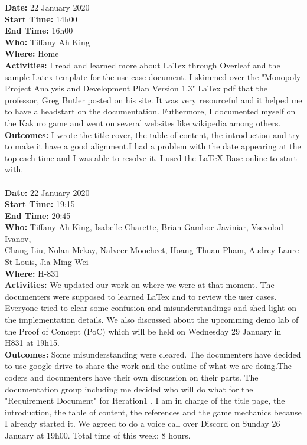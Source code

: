\documentclass[12pt]{article}
\begin{document}
{\bf Date:} 22 January 2020\\
{\bf Start Time:} 14h00\\
{\bf End Time:} 16h00\\
{\bf Who:} Tiffany Ah King\\
{\bf Where:} Home\\
{\bf Activities:} I read and learned more about LaTex through Overleaf and the sample Latex template for the use case document. I skimmed over the "Monopoly Project Analysis and Development Plan Version 1.3" LaTex pdf that the professor, Greg Butler posted on his site. It was very resourceful and it helped me to have a headstart on the documentation. Futhermore, I documented myself on the Kakuro game and went on several websites like wikipedia among others.\\
{\bf Outcomes:} I wrote the title cover, the table of content, the introduction and try to make it have a good alignment.I had a problem with the date appearing at the top each time and I was able to resolve it. I used the LaTeX Base online to start with.\\ \\

{\bf Date:} 22 January 2020\\
{\bf Start Time:} 19:15\\
{\bf End Time:} 20:45\\
{\bf Who:} Tiffany Ah King, Isabelle Charette, Brian Gamboc-Javiniar, Vsevolod Ivanov,\\
Chang Liu, Nolan Mckay, Nalveer Moocheet, Hoang Thuan Pham, Audrey-Laure St-Louis, Jia Ming Wei\\
{\bf Where:} H-831\\
{\bf Activities:} We updated our work on where we were at that moment. The documenters were supposed to learned LaTex and to review  the user cases. Everyone tried to clear some confusion and misunderstandings and shed light on the implementation details. We also discussed about the upcomming demo lab of the Proof of Concept (PoC) which will be held on Wednesday 29 January in H831 at 19h15.\\
{\bf Outcomes:} Some misunderstanding were cleared. The documenters have decided to use google drive to share the work and the outline of what we are doing.The coders and documenters have their own discussion on their parts. The documentation group including me decided who will do what for the "Requirement Document" for Iteration1 . I am in charge of the title page, the introduction, the table of content, the references and the game mechanics because I already started it. We agreed to do a voice call over Discord on Sunday 26 January at 19h00. Total time of this week: 8 hours.\\ \\ 
\end{document}

